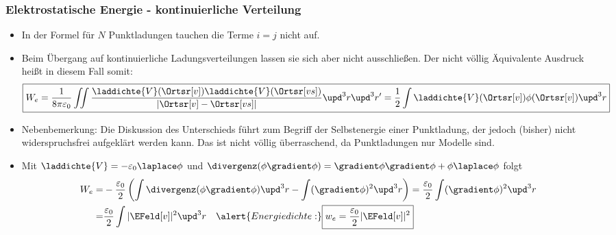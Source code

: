   \begin{frame}
    \frametitle{Elektrostatische Energie - kontinuierliche Verteilung}
    \begin{itemize}[<+->]
      \item In der Formel für $N$ Punktladungen tauchen die Terme
        $i=j$ nicht auf.
        \item Beim Übergang auf kontinuierliche Ladungsverteilungen
          lassen sie sich aber nicht ausschließen. Der \alert{nicht
            völlig Äquivalente} Ausdruck heißt in diesem Fall somit:
          $$
         \boxed{ W_e = \frac{1}{8\pi\varepsilon_0} \iint
    \frac{\laddichte{V}(\Ortsr[v]) \laddichte{V}(\Ortsr[vs])}{|\Ortsr[v]-
      \Ortsr[vs]|} \upd^3 r\upd^3 r' = \frac{1}{2} \int
    \laddichte{V}(\Ortsr[v])\phi(\Ortsr[v]) \upd^3 r}
  $$
  \item Nebenbemerkung: Die Diskussion des Unterschieds führt zum Begriff der
    \alert{Selbstenergie} einer Punktladung, der jedoch (bisher) nicht
    widerspruchsfrei aufgeklärt werden kann. Das ist nicht völlig
    überraschend, da Punktladungen nur Modelle sind.
    \item Mit $\laddichte{V}=-\varepsilon_0\laplace\phi$ und
      $\divergenz(\phi\gradient\phi) = \gradient\phi\gradient\phi + \phi\laplace\phi$
      folgt
      \begin{align*}
      W_e = & -\frac{\varepsilon_0}{2}\left(\int \divergenz(\phi\gradient\phi)
      \upd^3 r - \int (\gradient\phi)^2 \upd^3 r\right)  =
                     \frac{\varepsilon_0}{2} \int (\gradient\phi)^2 \upd^3 r\\
        = & \frac{\varepsilon_0}{2} \int |\EFeld[v]|^2 \upd^3 r
            \quad\alert{Energiedichte:} \boxed{w_e = \frac{\varepsilon_0}{2} |\EFeld[v]|^2}
      \end{align*}
    \end{itemize}
    \end{frame}

    
   
